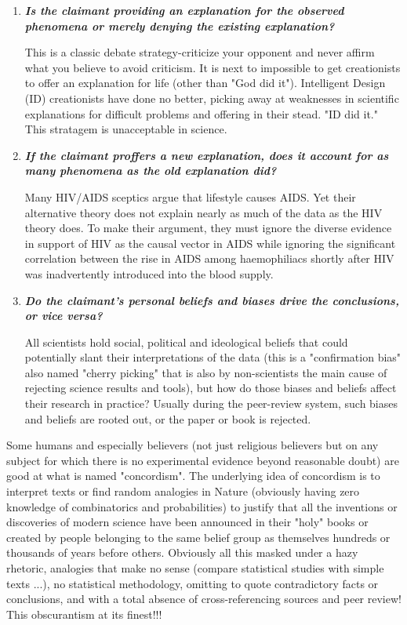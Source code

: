 \begin{enumerate}[label=\protect\circledbullet{\arabic*},leftmargin=15mm]
		\item \textit{\textbf{Is the claimant providing an explanation for the observed phenomena or merely 
             denying the existing explanation?}}
	
		This is a classic debate strategy-criticize your opponent and never affirm what you believe to avoid criticism. It is next to impossible to get creationists to offer an explanation for life (other than "God did it"). Intelligent Design (ID) creationists have done no better, picking away at weaknesses in scientific explanations for difficult problems and offering in their stead. "ID did it." This stratagem is unacceptable in science.

		\item \textit{\textbf{If the claimant proffers a new explanation, does it account for as many phenomena as the old explanation did?}}
	
		Many HIV/AIDS sceptics argue that lifestyle causes AIDS. Yet their alternative theory does not explain nearly as much of the data as the HIV theory does. To make their argument, they must ignore the diverse evidence in support of HIV as the causal vector in AIDS while ignoring the significant correlation between the rise in AIDS among haemophiliacs shortly after HIV was inadvertently introduced into the blood supply.

		\item \textit{\textbf{Do the claimant's personal beliefs and biases drive the conclusions, or vice versa?}}

		All scientists hold social, political and ideological beliefs that could potentially slant their interpretations of the data (this is a "confirmation bias" also named "cherry picking" that is also by non-scientists the main cause of rejecting science results and tools), but how do those biases and beliefs affect their research in practice? Usually during the peer-review system, such biases and beliefs are rooted out, or the paper or book is rejected.  
	\end{enumerate}
	
	Some humans and especially believers (not just religious believers but on any subject for which there is no experimental evidence beyond reasonable doubt) are good at what is named "concordism". The underlying idea of concordism is to interpret texts or find random analogies in Nature (obviously having zero knowledge of combinatorics and probabilities) to justify that all the inventions or discoveries of modern science have been announced in their "holy" books or created by people belonging to the same belief group as themselves hundreds or thousands of years before others. Obviously all this masked under a hazy rhetoric, analogies that make no sense (compare statistical studies with simple texts ...), no statistical methodology, omitting to quote contradictory facts or conclusions, and with a total absence of cross-referencing sources and peer review! This obscurantism at its finest!!!

